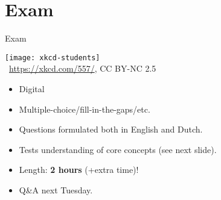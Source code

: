 \section{Exam}

\begin{frame}{Exam}

\begin{center}
		\texttt{[image: xkcd-students]}\\
		{\tiny \textcopyright~\url{https://xkcd.com/557/}, CC BY-NC 2.5}
		\end{center}
	

	\begin{itemize}
	
		\item Digital
	
		\item Multiple-choice/fill-in-the-gaps/etc.
		
		\item Questions formulated both in English and Dutch.
		
		\item Tests understanding of core concepts (see next slide).
		
		\item Length: \textbf{2 hours} (+extra time)!
		
		\item Q\&A next Tuesday.
	
	\end{itemize}

\end{frame}

